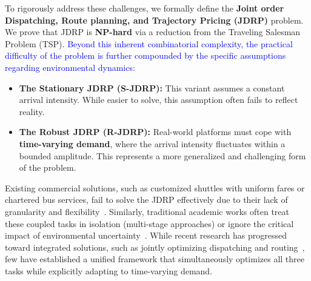 \documentclass[lettersize,journal]{IEEEtran}
\begin{document}
\color{blue}
To rigorously address these challenges, we formally define the \textbf{Joint order Dispatching, Route planning, and Trajectory Pricing (JDRP)} problem. We prove that JDRP is \textbf{NP-hard} via a reduction from the Traveling Salesman Problem (TSP). \textcolor{blue}{Beyond this inherent combinatorial complexity, the practical difficulty of the problem is further compounded by the specific assumptions regarding environmental dynamics:}
\begin{itemize}
    \item \textbf{The Stationary JDRP (S-JDRP):} This variant assumes a constant arrival intensity. While easier to solve, this assumption often fails to reflect reality.
    \item \textbf{The Robust JDRP (R-JDRP):} Real-world platforms must cope with \textbf{time-varying demand}, where the arrival intensity fluctuates within a bounded amplitude. This represents a more generalized and challenging form of the problem.
\end{itemize}

\color{black}

Existing commercial solutions, such as customized shuttles with uniform fares or chartered bus services, fail to solve the JDRP effectively due to their lack of granularity and flexibility~\cite{ref:JiangHCRide}. Similarly, traditional academic works often treat these coupled tasks in isolation (multi-stage approaches) or ignore the critical impact of environmental uncertainty~\cite{ref:dm, ref:DPEA, ref:PODP}. While recent research has progressed toward integrated solutions, such as jointly optimizing dispatching and routing~\cite{ref:odrp, ref:Lei2023}, few have established a unified framework that simultaneously optimizes all three tasks while explicitly adapting to time-varying demand.

\end{document}

